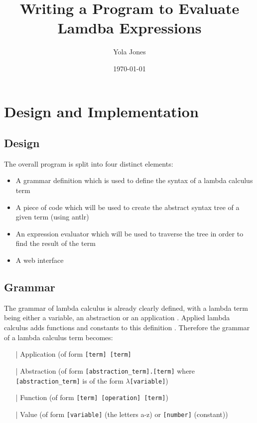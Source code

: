 \documentclass[a4paper,12pt]{report}
\begin{document}
\title{Writing a Program to Evaluate Lamdba Expressions}
\author{Yola Jones}
\date{\today}
\maketitle

\chapter{Design and Implementation}
\section{Design}

The overall program is split into four distinct elements:
\begin{itemize}
\item A grammar definition which is used to define the syntax of a lambda calculus term
\item A piece of code which will be used to create the abstract syntax tree of a given term (using antlr)
\item An expression evaluator which will be used to traverse the tree in order to find the result of the term
\item A web interface
\end{itemize}

\section{Grammar}

The grammar of lambda calculus is already clearly defined, with a lambda term being either a variable, an abstraction or an application \cite{Hankin2004}. Applied lambda calculus adds functions and constants to this definition \cite{Slonneger1995}. Therefore the grammar of a lambda calculus term becomes:

\begin{itemize}
\item[|] Application (of form \texttt{[term] [term]}
\item[|] Abstraction (of form \texttt{[abstraction_term].[term]} where \texttt{[abstraction_term]} is of the form \texttt{$\lambda$[variable]})
\item[|] Function (of form \texttt{[term] [operation] [term]})
\item[|] Value (of form \texttt{[variable]} (the letters a-z) or \texttt{[number]} (constant))
\end{itemize}
\end{document}
